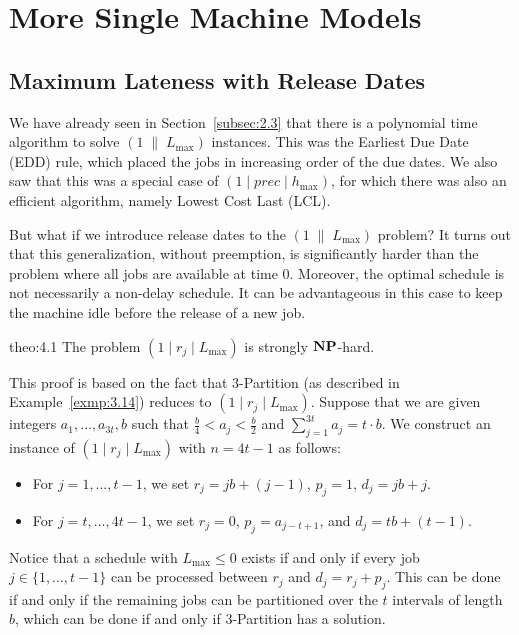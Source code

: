 \section{More Single Machine Models} \label{sec:4}

\subsection{Maximum Lateness with Release Dates} \label{subsec:4.1}
We have already seen in Section~\ref{subsec:2.3} that there is a polynomial 
time algorithm to solve $(1\;\|\;L_{\max})$ instances. This was the 
Earliest Due Date (EDD) rule, which placed the jobs in increasing order of the 
due dates. We also saw that this was a special case of $(1 \mid prec 
\mid h_{\max})$, for which there was also an efficient algorithm, namely 
Lowest Cost Last (LCL). 

But what if we introduce release dates to the $(1\;\|\;L_{\max})$ problem? 
It turns out that this generalization, without preemption, is significantly 
harder than the problem where all jobs are available at time $0$. Moreover, 
the optimal schedule is not necessarily a non-delay schedule. It can be 
advantageous in this case to keep the machine idle before the release of a 
new job. 

\begin{theo}{theo:4.1}
    The problem $(1 \mid r_j \mid L_{\max})$ is strongly $\operatorname{\textbf{NP}}$-hard. 
\end{theo}
\begin{pf}
    This proof is based on the fact that {\sc $3$-Partition} (as described 
    in Example~\ref{exmp:3.14}) reduces to $(1 \mid r_j \mid L_{\max})$. 
    Suppose that we are given integers $a_1, \dots, a_{3t}, b$ such that 
    $\frac{b}{4} < a_j < \frac{b}{2}$ and $\sum_{j=1}^{3t} a_j = t \cdot b$. 
    We construct an instance of $(1 \mid r_j \mid L_{\max})$ with 
    $n = 4t - 1$ as follows: 
    \begin{itemize}
        \item For $j = 1, \dots, t-1$, we set $r_j = jb + (j-1)$, $p_j = 1$, 
        $d_j = jb + j$. 
        \item For $j = t, \dots, 4t-1$, we set $r_j = 0$, $p_j = a_{j-t+1}$, 
        and $d_j = tb + (t-1)$. 
    \end{itemize}
    Notice that a schedule with $L_{\max} \leq 0$ exists if and only if 
    every job $j \in \{1, \dots, t-1\}$ can be processed between 
    $r_j$ and $d_j = r_j + p_j$. This can be done if and only if the remaining 
    jobs can be partitioned over the $t$ intervals of length $b$, which can be 
    done if and only if {\sc $3$-Partition} has a solution. 
\end{pf}

